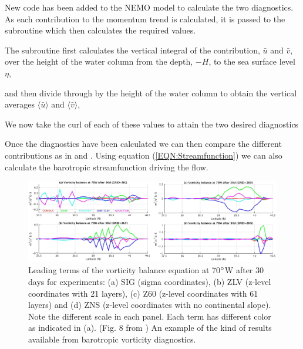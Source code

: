 \documentclass[..\EOYR.tex]{subfiles}
\begin{document}
New code has been added to the NEMO model 
to calculate the two diagnostics. As each contribution to the momentum trend is calculated, it is passed to the subroutine which then calculates the required values.

The subroutine first calculates the vertical integral of the contribution, $\bar{u}$ and $\bar{v}$, over the height of the water column from the depth, $-H$, to the sea surface level $\eta$,


and then divide through by the height of the water column to obtain the vertical averages $\langle\bar{u}\rangle$ and $\langle\bar{v}\rangle$,


We now take the curl of each of these values to attain the two desired diagnostics


    
Once the diagnostics have been calculated we can then compare the different contributions as in \citep{Yeager2015} and \citep{Gula2014}. Using equation (\ref{EQN:Streamfunction}) we can also calculate the barotropic streamfunction driving the flow.\\

\begin{figure}[t]
    \includegraphics[width=\linewidth]{Figures/Ezer2016bFig8.jpg}
    \caption{Leading terms of the vorticity balance equation at 70$\degree$W after 30 days for experiments: (a) SIG (sigma coordinates), (b) ZLV (z-level coordinates with 21 layers), (c) Z60 (z-level coordinates with 61 layers) and (d) ZNS (z-level coordinates with no continental slope). Note the different scale in each panel. Each term has different color as indicated in (a). (Fig. 8 from \citep{Ezer2016b}) An example of the kind of results available from barotropic vorticity diagnostics.}
    \label{FIG:Ezer2016bFig8}
\end{figure}
\end{document}
